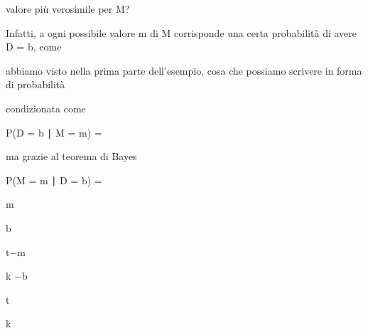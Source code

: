 \documentclass[a4paper,portrait,12pt]{article}
\begin{document}
\begin{flushleft}
valore più verosimile per M?
\end{flushleft}


\begin{flushleft}
Infatti, a ogni possibile valore m di M corrisponde una certa probabilit\`{a} di avere D = b, come
\end{flushleft}


\begin{flushleft}
abbiamo visto nella prima parte dell'esempio, cosa che possiamo scrivere in forma di probabilit\`{a}
\end{flushleft}


\begin{flushleft}
condizionata come
\end{flushleft}


\begin{flushleft}
P(D = b ∣ M = m) =
\end{flushleft}


\begin{flushleft}
ma grazie al teorema di Bayes
\end{flushleft}


\begin{flushleft}
P(M = m ∣ D = b) =
\end{flushleft}





\begin{flushleft}
m
\end{flushleft}


\begin{flushleft}
b
\end{flushleft}





\begin{flushleft}
t$-$m
\end{flushleft}


\begin{flushleft}
k $-$b
\end{flushleft}


\begin{flushleft}
t
\end{flushleft}


\begin{flushleft}
k
\end{flushleft}
\end{document}
